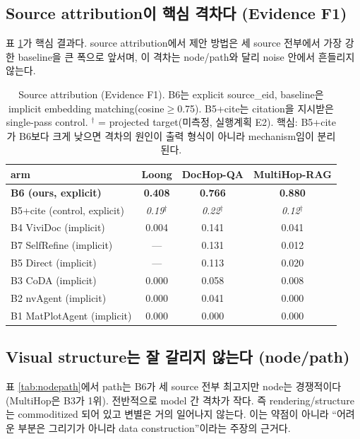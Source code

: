 \documentclass[11pt]{article}
\newcommand{\proj}[1]{\textit{#1}$^\dagger$} %
\begin{document}
\subsection{Source attribution이 핵심 격차다 (Evidence F1)}
표 \ref{tab:evidence}가 핵심 결과다. source attribution에서 제안 방법은 세 source 전부에서 가장
강한 baseline을 큰 폭으로 앞서며, 이 격차는 node/path와 달리 noise 안에서 흔들리지 않는다.

\begin{table}[h]
\centering\small
\begin{tabular}{lccc}
\toprule
arm & Loong & DocHop-QA & MultiHop-RAG \\
\midrule
\textbf{B6 (ours, explicit)} & \textbf{0.408} & \textbf{0.766} & \textbf{0.880} \\
B5+cite (control, explicit) & \proj{0.19} & \proj{0.22} & \proj{0.12} \\
B4 ViviDoc (implicit) & 0.004 & 0.141 & 0.041 \\
B7 SelfRefine (implicit) & --- & 0.131 & 0.012 \\
B5 Direct (implicit) & --- & 0.113 & 0.020 \\
B3 CoDA (implicit) & 0.000 & 0.058 & 0.008 \\
B2 nvAgent (implicit) & 0.000 & 0.041 & 0.000 \\
B1 MatPlotAgent (implicit) & 0.000 & 0.000 & 0.000 \\
\bottomrule
\end{tabular}
\caption{Source attribution (Evidence F1). B6는 explicit source\_eid, baseline은 implicit
embedding matching(cosine$\geq$0.75). B5+cite는 citation을 지시받은 single-pass control.
$^\dagger$ = projected target(미측정, 실행계획 E2). 핵심: B5+cite가 B6보다 크게 낮으면 격차의
원인이 출력 형식이 아니라 mechanism임이 분리된다.}
\label{tab:evidence}
\end{table}

\subsection{Visual structure는 잘 갈리지 않는다 (node/path)}
표 \ref{tab:nodepath}에서 path는 B6가 세 source 전부 최고지만 node는 경쟁적이다(MultiHop은 B3가
1위). 전반적으로 model 간 격차가 작다. 즉 rendering/structure는 commoditized 되어 있고 변별은
거의 일어나지 않는다. 이는 약점이 아니라 ``어려운 부분은 그리기가 아니라 data construction''이라는
주장의 근거다.
\end{document}
